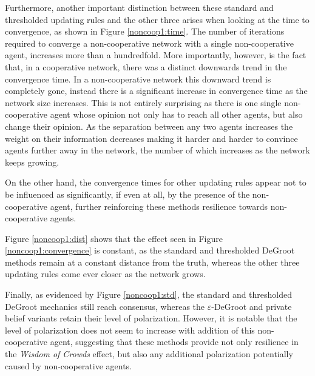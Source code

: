 \documentclass[a4paper, 12pt]{report}
\begin{document}
Furthermore, another important distinction between these standard and thresholded updating rules and the other three arises when looking at the time to convergence, as shown in Figure \ref{noncoop1:time}. The number of iterations required to converge a non-cooperative network with a single non-cooperative agent, increases more than a hundredfold. More importantly, however, is the fact that, in a cooperative network, there was a distinct downwards trend in the convergence time. In a non-cooperative network this downward trend is completely gone, instead there is a significant increase in convergence time as the network size increases. This is not entirely surprising as there is one single non-cooperative agent whose opinion not only has to reach all other agents, but also change their opinion. As the separation between any two agents increases the weight on their information decreases making it harder and harder to convince agents further away in the network, the number of which increases as the network keeps growing.

On the other hand, the convergence times for other updating rules appear not to be influenced as significantly, if even at all, by the presence of the non-cooperative agent, further reinforcing these methods resilience towards non-cooperative agents.

Figure \ref{noncoop1:dist} shows that the effect seen in Figure \ref{noncoop1:convergence} is constant, as the standard and thresholded DeGroot methods remain at a constant distance from the truth, whereas the other three updating rules come ever closer as the network grows.

Finally, as evidenced by Figure \ref{noncoop1:std}, the standard and thresholded DeGroot mechanics still reach consensus, whereas the $\varepsilon$-DeGroot and private belief variants retain their level of polarization. However, it is notable that the level of polarization does not seem to increase with addition of this non-cooperative agent, suggesting that these methods provide not only resilience in the \emph{Wisdom of Crowds} effect, but also any additional polarization potentially caused by non-cooperative agents.
\end{document}
